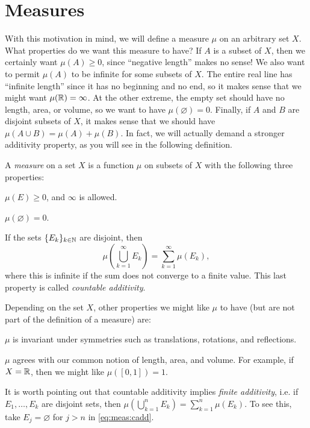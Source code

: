 \documentclass[main.tex]{subfiles}
\begin{document}
\section{Measures}

With this motivation in mind, we will define a measure $\mu$ on an arbitrary set $X$. What properties do we want this measure to have? If $A$ is a subset of $X$, then we certainly want $\mu(A) \geq 0$, since ``negative length'' makes no sense! We also want to permit $\mu(A)$ to be infinite for some subsets of $X$. The entire real line has ``infinite length'' since it has no beginning and no end, so it makes sense that we might want $\mu({\mathbb R}) = \infty$. At the other extreme, the empty set should have no length, area, or volume, so we want to have $\mu(\varnothing) = 0$. Finally, if $A$ and $B$ are disjoint subsets of $X$, it makes sense that we should have $\mu(A\cup B) = \mu(A) + \mu(B)$. In fact, we will actually demand a stronger additivity property, as you will see in the following definition.

\begin{definition}\label{def:measure}
A \emph{measure} on a set $X$ is a function $\mu$ on subsets of $X$ with the following three properties:
\begin{romannum}
\item $\mu(E) \geq 0$, and $\infty$ is allowed.
\item $\mu(\varnothing) = 0$.
\item If the sets $\{E_k\}_{k \in {\mathbb N}}$ are disjoint, then 
	\begin{equation}\label{eq:meas:cadd}
	\mu \left( \bigcup_{k=1}^\infty E_k \right) = \sum_{k=1}^\infty \mu(E_k),
	\end{equation}
	where this is infinite if the sum does not converge to a finite value. This last property is called \emph{countable additivity}.
\end{romannum}
\end{definition}
Depending on the set $X$, other properties we might like $\mu$ to have (but are not part of the definition of a measure) are:
\begin{romannum}
\setcounter{rmnum}{3}
\item $\mu$ is invariant under symmetries such as translations, rotations, and reflections.
\item $\mu$ agrees with our common notion of length, area, and volume. For example, if $X = {\mathbb R}$, then we might like $\mu([0,1]) = 1$.
\end{romannum}
It is worth pointing out that countable additivity implies \emph{finite additivity}, i.e. if $E_1, \dots, E_k$ are disjoint sets, then $\mu \left( \bigcup_{k=1}^n E_k \right) = \sum_{k=1}^n \mu(E_k)$. To see this, take $E_j = \varnothing$ for $j > n$ in \cref{eq:meas:cadd}.
\end{document}
